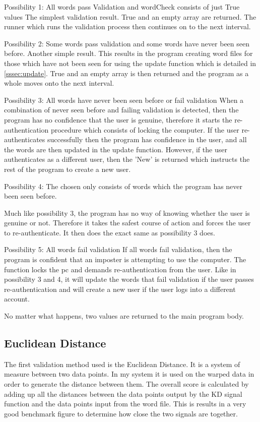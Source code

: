 \documentclass[10pt,a4paper]{report}
\begin{document}
Possibility 1: All words pass Validation and wordCheck consists of just True values
The simplest validation result. True and an empty array are returned. The runner which runs the validation process then continues on to the next interval.

Possibility 2: Some words pass validation and some words have never been seen before.
Another simple result. This results in the program creating word files for those which have not been seen for using the update function which is detailed in \ref{sssec:update}. True and an empty array is then returned and the program as a whole moves onto the next interval.

Possibility 3: All words have never been seen before or fail validation
When a combination of never seen before and failing validation is detected, then the program has no confidence that the user is genuine, therefore it starts the re-authentication procedure which consists of locking the computer. If the user re-authenticates successfully then the program has confidence in the user, and all the words are then updated in the update function. However, if the user authenticates as a different user, then the 'New' is returned which instructs the rest of the program to create a new user.

Possibility 4: The chosen only consists of words which the program has never been seen before.

Much like possibility 3, the program has no way of knowing whether the user is genuine or not. Therefore it takes the safest course of action and forces the user to re-authenticate. It then does the exact same as possibility 3 does.

Possibility 5: All words fail validation
If all words fail validation, then the program is confident that an imposter is attempting to use the computer. The function locks the pc and demands re-authentication from the user. Like in possibility 3 and 4, it will update the words that fail validation if the user passes re-authentication and will create a new user if the user logs into a different account.

No matter what happens, two values are returned to the main program body.

\subsection{Euclidean Distance}

The first validation method used is the Euclidean Distance. It is a system of measure between two data points. In my system it is used on the warped data in order to generate the distance between them. The overall score is calculated by adding up all the distances between the data points output by the KD signal function and the data points input from the word file. This is results in a very good benchmark figure to determine how close the two signals are together. 
\end{document}
